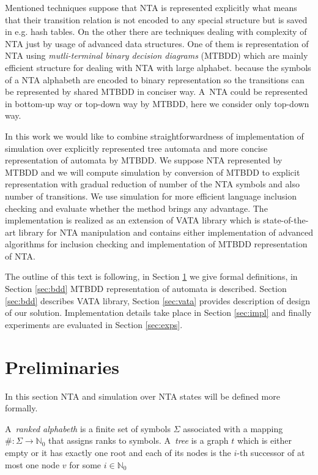 \documentclass[a4paper, 12pt]{article}
\begin{document}
Mentioned techniques suppose that NTA is represented explicitly what means that their transition relation is not encoded to any special structure but
is saved in e.g. hash tables.
On the other there are techniques dealing with complexity of NTA just by usage of advanced data structures.
One of them is representation of NTA using \textit{mutli-terminal binary decision diagrams} (MTBDD) which are mainly efficient structure for dealing with NTA with large alphabet.
because the symbols of a NTA alphabeth are encoded to binary representation so the transitions can be represented by shared MTBDD in conciser way.
A~NTA could be represented in bottom-up way or top-down way by MTBDD, here we consider only top-down way.

In this work we would like to combine straightforwardness of implementation of simulation over explicitly
represented tree automata and more concise representation of automata by MTBDD.
We suppose NTA represented by MTBDD and we will compute simulation by conversion of MTBDD
to explicit representation with gradual reduction of number of the NTA symbols and also number of transitions.
We use simulation for more efficient language inclusion checking and evaluate whether the method brings any advantage.
The implementation is realized as an extension of VATA library which is state-of-the-art library for NTA manipulation
and contains either implementation of advanced algorithms for inclusion checking and implementation of MTBDD representation of NTA.

The outline of this text is following, in Section \ref{sec:analysis} we give formal definitions, in Section \ref{sec:bdd} MTBDD representation of automata is described.
Section \ref{sec:bdd} describes VATA library, Section \ref{sec:vata} provides description of design of our solution.
Implementation details take place in Section \ref{sec:impl} and finally experiments are evaluated in Section \ref{sec:exps}.

\section{Preliminaries}
\label{sec:analysis}
In this section NTA and simulation over NTA states will be defined more formally.

A~\emph{ranked alphabeth} is a finite set of symbols $\Sigma$ associated with a mapping $\#: \Sigma \rightarrow \mathbb{N}_0$
that assigns ranks to symbols. A~\emph{tree} is a graph $t$ which is either empty or it has exactly one root and each of its
nodes is the $i$-th successor of at most one node $v$ for some $i \in \mathbb{N}_0$
\end{document}
